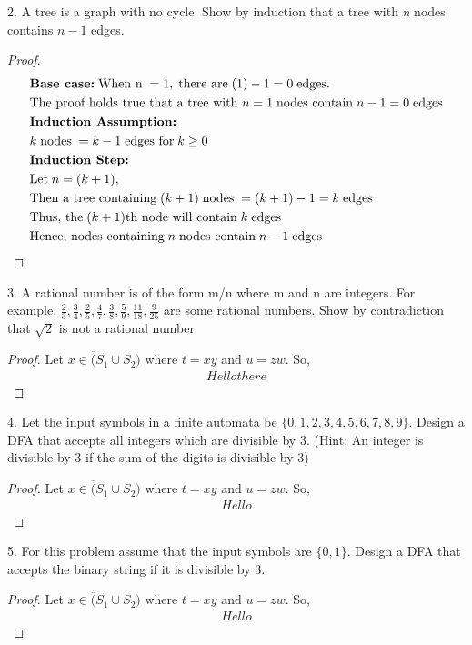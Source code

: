 \documentclass[12pt, letterpaper]{article}
\begin{document}
    2. A tree is a graph with no cycle. Show by induction that a tree with \textit{n}
    nodes contains $n - 1$ edges.
    \begin{proof}
        \begin{align*}
        & \mbox{\textbf{Base case:}}\; \mbox{When n} \; = 1, \; \mbox{there are}\; (1) - 1 = 0\; \mbox{edges.}\\
        & \mbox{The proof holds true that a tree with }n = 1 \; \mbox{nodes contain}\; n - 1 = 0 \;\mbox{edges}\\
        & \mbox{\textbf{Induction Assumption:}}\\
        &k \; \mbox{nodes}\; = k - 1 \; \mbox{edges for}\;  k \ge 0\\
        & \mbox{\textbf{Induction Step:}}\\
            &\mbox{Let}\; n = (k+1),\\
            & \mbox{Then a tree containing}\;(k + 1)\; \mbox{nodes}\; = (k+1) - 1 = k \; \mbox{edges}\\
            & \mbox{Thus, the}\; (k+1)\mbox{th node will contain}\; k \;\mbox{edges}\\ 
            & \mbox{Hence, nodes containing} \; n \; \mbox{nodes contain}\; n - 1 \; \mbox{edges}\\
        \end{align*}
    \end{proof}

    3. A rational number is of the form m/n where m and n are integers.
    For example, $\frac{2}{3},\frac{3}{4},\frac{2}{5},\frac{4}{7},\frac{3}{8},\frac{5}{9},\frac{11}{18},\frac{9}{25}$ are some rational
    numbers. Show by contradiction that $\sqrt{2}$ is not a rational number
    \begin{proof}
        Let $x \in \overline({S_1 \cup S_2})$ where $t=xy$ and $u=zw$. So,
        \begin{align*}
            Hello there
        \end{align*}
    \end{proof}

    4. Let the input symbols in a finite automata be $\{0, 1, 2, 3, 4, 5, 6, 7, 8, 9\}$.
    Design a DFA that accepts all integers which are divisible by $3$. (Hint:
    An integer is divisible by 3 if the sum of the digits is divisible by 3)
    \begin{proof}
        Let $x \in \overline({S_1 \cup S_2})$ where $t=xy$ and $u=zw$. So,
        \begin{align*}
            Hello
        \end{align*}
    \end{proof}

    5. For this problem assume that the input symbols are $\{0, 1\}$. Design a
    DFA that accepts the binary string if it is divisible by 3.
    \begin{proof}
        Let $x \in \overline({S_1 \cup S_2})$ where $t=xy$ and $u=zw$. So,
        \begin{align*}
            Hello
        \end{align*}
    \end{proof}
\end{document}
